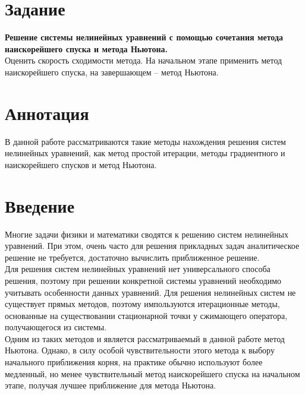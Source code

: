 \documentclass[a4paper, 12pt]{article}
\begin{document}
\tableofcontents
\newpage
\section*{Задание}
\textbf{Решение системы нелинейных уравнений с помощью сочетания
метода наискорейшего спуска и метода Ньютона.}\\
Оценить скорость сходимости метода. На начальном этапе применить
метод наискорейшего спуска, на завершающем – метод Ньютона.
\newpage
\section*{Аннотация}
В данной работе рассматриваются такие методы нахождения решения систем нелинейных уравнений, как метод простой итерации, методы градиентного и наискорейшего спусков и метод Ньютона.
\newpage
\section*{Введение}
Многие задачи физики и математики сводятся к решению систем нелинейных уравнений. При этом, очень часто для решения прикладных задач аналитическое решение не требуется, достаточно вычислить приближенное решение.\\
Для решения систем нелинейных уравнений нет универсального способа решения, поэтому при решении конкретной системы уравнений необходимо
учитывать особенности данных уравнений. Для решения нелинейных систем не существует прямых методов, поэтому импользуются итерационные методы, основанные на существовании стационарной точки у сжимающего оператора, получающегося из системы.\\
Одним из таких методов и является рассматриваемый в данной работе метод Ньютона. Однако, в силу особой чувствительности этого метода
к выбору начального приближения корня, на практике обычно используют более медленный, но менее чувствительный метод наискорейшего спуска
на начальном этапе, получая лучшее приближение для метода Ньютона.
\newpage
\nocite{BH}
\end{document}
